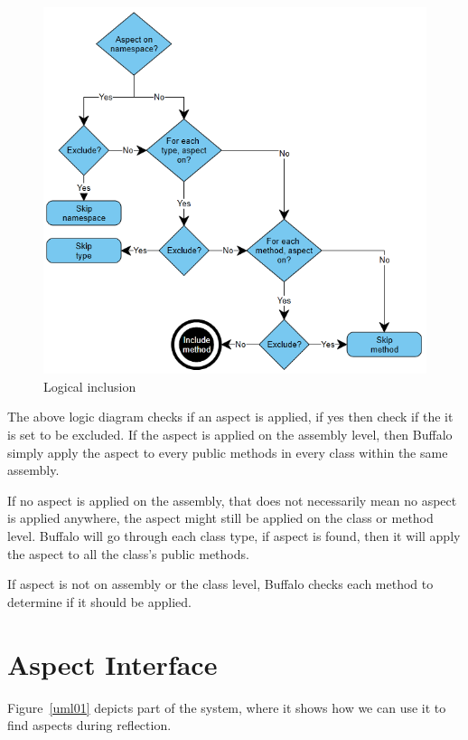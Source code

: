 \begin{figure}[here]
  \includegraphics[scale=1.0]{AspectLogicalInclusion.PNG}
  \centering
  \caption{Logical inclusion\label{logical_inclusion}}
\end{figure}

The above logic diagram checks if an aspect is applied, if yes then check if the it is set to be excluded. If the aspect is applied on the assembly level, then Buffalo simply apply the aspect to every public methods in every class within the same assembly.

If no aspect is applied on the assembly, that does not necessarily mean no aspect is applied anywhere, the aspect might still be applied on the class or method level. Buffalo will go through each class type, if aspect is found, then it will apply the aspect to all the class’s public methods.

If aspect is not on assembly or the class level, Buffalo checks each method to determine if it should be applied.

\section{Aspect Interface}

Figure~\ref{uml01} depicts part of the system, where it shows how we can use it to find aspects during reflection.

